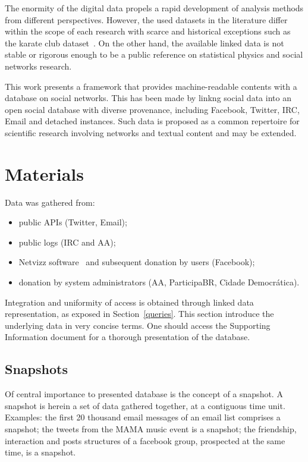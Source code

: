 \documentclass[review]{elsarticle}
\begin{document}
The enormity of the digital data propels a rapid development of analysis methods
from different perspectives.
However, the used datasets in the literature differ within the scope of each research with
scarce and historical exceptions such as the
karate club dataset~\cite{newmanBook}.
On the other hand, the available linked data is not 
stable or rigorous enough to be
a public reference on statistical physics and social networks research.
 
This work presents a framework that provides machine-readable contents with a
database on social networks.
This has been made by linkng social data into an open social database with diverse
provenance, including Facebook, Twitter, IRC, Email and detached
instances.
Such data is proposed as a common repertoire for scientific
research involving networks and textual content and may be extended.


\section{Materials}\label{materials}
Data was gathered from:
\begin{itemize}
    \item public APIs (Twitter, Email);
    \item public logs (IRC and AA);
    \item Netvizz software~\cite{netvizz} and subsequent donation by users (Facebook);
    \item donation by system administrators (AA, ParticipaBR, Cidade Democr\'atica).
\end{itemize}

Integration and uniformity of access is obtained through linked data
representation, as exposed in Section~\ref{queries}.
This section introduce the underlying data in very concise terms.
One should access the Supporting Information document for
a thorough presentation of the database.

\subsection{Snapshots}
Of central importance to presented database is the concept of a snapshot.
A snapshot is herein a set of data gathered together, at a contiguous time
unit.
Examples: the first 20 thousand email messages of an email list
comprises a snapshot; the tweets from the MAMA music event is a
snapshot; the friendship, interaction and posts structures of a facebook
group, prospected at the same time, is a snapshot.
\end{document}
